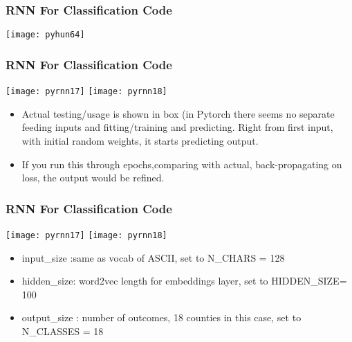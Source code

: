 \begin{frame}[fragile] \frametitle{RNN For Classification Code}
\begin{center}
\texttt{[image: pyhun64]}
\end{center}
\end{frame}

\begin{frame}[fragile] \frametitle{RNN For Classification Code}
\begin{center}
\texttt{[image: pyrnn17]}
\texttt{[image: pyrnn18]}
\end{center}
\begin{itemize}
\item Actual testing/usage is shown in box (in Pytorch there seems no separate feeding inputs and fitting/training and predicting. Right from first input, with initial random weights, it starts predicting output.
\item If you run this through epochs,comparing with actual, back-propagating on loss, the output would be refined.
\end{itemize}

\end{frame}

\begin{frame}[fragile] \frametitle{RNN For Classification Code}
\begin{center}
\texttt{[image: pyrnn17]}
\texttt{[image: pyrnn18]}
\end{center}
\begin{itemize}
\item input\_size :same as vocab of ASCII, set to N\_CHARS = 128
\item hidden\_size:  word2vec length for embeddings layer, set to HIDDEN\_SIZE= 100
\item output\_size : number of outcomes, 18 counties in this case, set to N\_CLASSES = 18
\end{itemize}

\end{frame}

